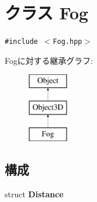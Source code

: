 \hypertarget{classm3g_1_1Fog}{
\section{クラス Fog}
\label{classm3g_1_1Fog}
}
{\tt \#include $<$Fog.hpp$>$}

Fogに対する継承グラフ:\begin{figure}[H]
\begin{center}
\leavevmode
\includegraphics[height=3cm]{classm3g_1_1Fog}
\end{center}
\end{figure}
\subsection*{構成}
\begin{CompactItemize}
\item 
struct \textbf{Distance}
\end{CompactItemize}
